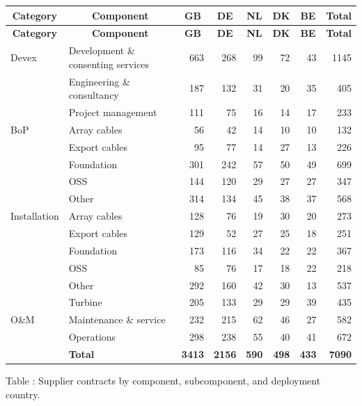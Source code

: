 \begingroup
\scriptsize
\setlength{\tabcolsep}{2pt}
\renewcommand{\arraystretch}{1.0}
\setlength{\LTleft}{0pt}
\setlength{\LTright}{0pt}
\begin{longtable}{@{\extracolsep{\fill}}llrrrrrr}
\toprule
\multicolumn{1}{c}{\textbf{Category}} & \multicolumn{1}{c}{\textbf{Component}} & \multicolumn{1}{c}{\textbf{GB}} & \multicolumn{1}{c}{\textbf{DE}} & \multicolumn{1}{c}{\textbf{NL}} & \multicolumn{1}{c}{\textbf{DK}} & \multicolumn{1}{c}{\textbf{BE}} & \multicolumn{1}{c}{\textbf{Total}} \\
\midrule
\endfirsthead
\toprule
\multicolumn{1}{c}{\textbf{Category}} & \multicolumn{1}{c}{\textbf{Component}} & \multicolumn{1}{c}{\textbf{GB}} & \multicolumn{1}{c}{\textbf{DE}} & \multicolumn{1}{c}{\textbf{NL}} & \multicolumn{1}{c}{\textbf{DK}} & \multicolumn{1}{c}{\textbf{BE}} & \multicolumn{1}{c}{\textbf{Total}} \\
\midrule
\endhead
\bottomrule
\endfoot
\bottomrule
\endlastfoot
Devex & Development \& consenting services & \num{663} & \num{268} & \num{99} & \num{72} & \num{43} & \num{1145} \\
 & Engineering \& consultancy & \num{187} & \num{132} & \num{31} & \num{20} & \num{35} & \num{405} \\
 & Project management & \num{111} & \num{75} & \num{16} & \num{14} & \num{17} & \num{233} \\
\midrule
BoP & Array cables & \num{56} & \num{42} & \num{14} & \num{10} & \num{10} & \num{132} \\
 & Export cables & \num{95} & \num{77} & \num{14} & \num{27} & \num{13} & \num{226} \\
 & Foundation & \num{301} & \num{242} & \num{57} & \num{50} & \num{49} & \num{699} \\
 & OSS & \num{144} & \num{120} & \num{29} & \num{27} & \num{27} & \num{347} \\
 & Other & \num{314} & \num{134} & \num{45} & \num{38} & \num{37} & \num{568} \\
\midrule
Installation & Array cables & \num{128} & \num{76} & \num{19} & \num{30} & \num{20} & \num{273} \\
 & Export cables & \num{129} & \num{52} & \num{27} & \num{25} & \num{18} & \num{251} \\
 & Foundation & \num{173} & \num{116} & \num{34} & \num{22} & \num{22} & \num{367} \\
 & OSS & \num{85} & \num{76} & \num{17} & \num{18} & \num{22} & \num{218} \\
 & Other & \num{292} & \num{160} & \num{42} & \num{30} & \num{13} & \num{537} \\
 & Turbine & \num{205} & \num{133} & \num{29} & \num{29} & \num{39} & \num{435} \\
\midrule
O\&M & Maintenance \& service & \num{232} & \num{215} & \num{62} & \num{46} & \num{27} & \num{582} \\
 & Operations & \num{298} & \num{238} & \num{55} & \num{40} & \num{41} & \num{672} \\
\midrule
 & \textbf{Total} & {\bfseries\num{3413}} & {\bfseries\num{2156}} & {\bfseries\num{590}} & {\bfseries\num{498}} & {\bfseries\num{433}} & {\bfseries\num{7090}} \\
\end{longtable}
\endgroup

\addtocounter{table}{-1}
\label{tab:supplier_contracts_country}
Table \thetable: Supplier contracts by component, subcomponent, and deployment country.